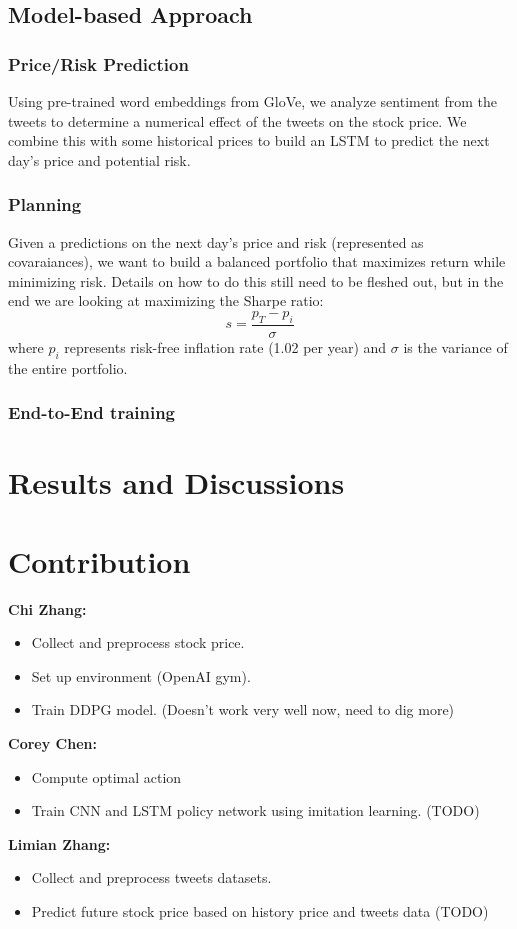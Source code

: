 \documentclass[a4paper, 10pt]{article}
\begin{document}
\begin{spacing}{1.2}
    
    \subsection{Model-based Approach}
    \subsubsection{Price/Risk Prediction}
    Using pre-trained word embeddings from GloVe, we analyze sentiment from the tweets to determine a numerical effect of the tweets on the stock price. We combine this with some historical prices to build an LSTM to predict the next day's price and potential risk. 
    \subsubsection{Planning}
    Given a predictions on the next day's price and risk (represented as covaraiances), we want to build a balanced portfolio that maximizes return while minimizing risk. Details on how to do this still need to be fleshed out, but in the end we are looking at maximizing the Sharpe ratio: 
    \begin{equation}
    s = \frac{p_T - p_i}{\sigma}
    \end{equation}
    where $p_i$ represents risk-free inflation rate (1.02 per year) and $\sigma$ is the variance of the entire portfolio.
    \subsubsection{End-to-End training}
    
    \section{Results and Discussions}
    
    \section{Contribution}
    \textbf{Chi Zhang:} 
    \begin{itemize}
      \item Collect and preprocess stock price.
      \item Set up environment (OpenAI gym).
      \item Train DDPG model. (Doesn't work very well now, need to dig more)
    \end{itemize}
    \textbf{Corey Chen:}
    \begin{itemize}
      \item Compute optimal action
      \item Train CNN and LSTM policy network using imitation learning. (TODO)
    \end{itemize}
    \textbf{Limian Zhang:}
    \begin{itemize}
      \item Collect and preprocess tweets datasets.
      \item Predict future stock price based on history price and tweets data (TODO)
    \end{itemize}
    

\end{spacing}
\end{document}
